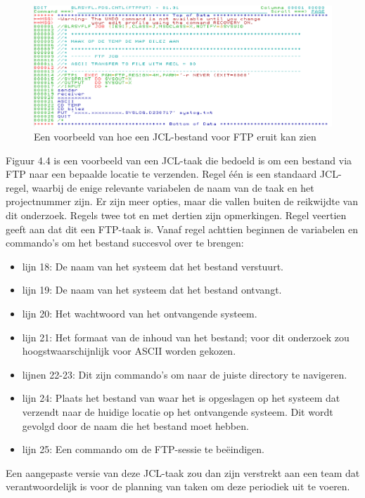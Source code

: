 \begin{figure}[h]
    \centering
    \includegraphics[width=1\linewidth]{bachproef//graphics/FTP JCL.png}
    \caption{Een voorbeeld van hoe een JCL-bestand voor FTP eruit kan zien}
    \label{fig:Een voorbeeld van hoe een JCL-bestand voor FTP eruit kan zien}
\end{figure}

Figuur 4.4 is een voorbeeld van een JCL-taak die bedoeld is om een bestand via FTP naar een bepaalde locatie te verzenden. Regel één is een standaard JCL-regel, waarbij de enige relevante variabelen de naam van de taak en het projectnummer zijn. Er zijn meer opties, maar die vallen buiten de reikwijdte van dit onderzoek. Regels twee tot en met dertien zijn opmerkingen. Regel veertien geeft aan dat dit een FTP-taak is. Vanaf regel achttien beginnen de variabelen en commando's om het bestand succesvol over te brengen:

\begin{itemize}
    \item lijn 18: De naam van het systeem dat het bestand verstuurt.
    \item lijn 19: De naam van het systeem dat het bestand ontvangt.
    \item lijn 20: Het wachtwoord van het ontvangende systeem.
    \item lijn 21: Het formaat van de inhoud van het bestand; voor dit onderzoek zou hoogstwaarschijnlijk voor ASCII worden gekozen.
    \item lijnen 22-23: Dit zijn commando's om naar de juiste directory te navigeren.
    \item lijn 24: Plaats het bestand van waar het is opgeslagen op het systeem dat verzendt naar de huidige locatie op het ontvangende systeem. Dit wordt gevolgd door de naam die het bestand moet hebben.
    \item lijn 25: Een commando om de FTP-sessie te beëindigen.
\end{itemize}

Een aangepaste versie van deze JCL-taak zou dan zijn verstrekt aan een team dat verantwoordelijk is voor de planning van taken om deze periodiek uit te voeren.